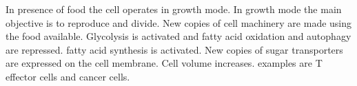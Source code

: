 In presence of food the cell operates in growth mode. In growth mode the main objective is to reproduce and divide. New copies of cell machinery are made using the food available. Glycolysis is activated and fatty acid oxidation and autophagy are repressed. fatty acid synthesis is activated. New copies of sugar transporters are expressed on the cell membrane. Cell volume increases. examples are T effector cells and cancer cells.